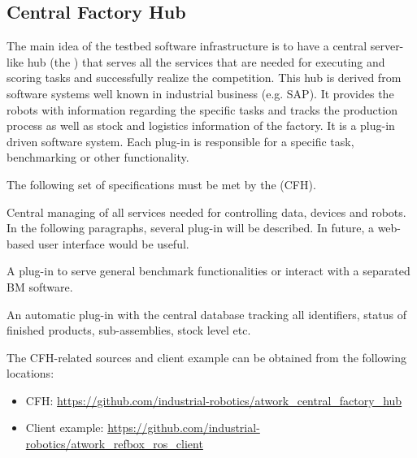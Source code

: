 
\subsection{Central Factory Hub}
\label{ssec:CFH}

The main idea of the \erlir testbed software infrastructure is to have a central server-like hub (the \erlir \CFH) that serves all the services that are needed for executing and scoring tasks and successfully realize the competition. This hub is derived from software systems well known in industrial business (e.g. SAP). It provides the robots with information regarding the specific tasks and tracks the production process as well as stock and logistics information of the \rollin factory. It is a plug-in driven software system. Each plug-in is responsible for a specific task, benchmarking or other functionality.

\noindent
The following set of specifications must be met by the \erlir \CFH (CFH).
\begin{CFHSpec}
Central managing of all services needed for controlling data, devices and robots. In the following paragraphs, several plug-in will be described. In future, a web-based user interface would be useful.
\end{CFHSpec}

\begin{CFHSpec}
A plug-in to serve general benchmark functionalities or interact with a separated BM software.
\end{CFHSpec}

\begin{CFHSpec}
An automatic plug-in with the central database tracking all identifiers, status of finished products, sub-assemblies, stock level etc. 
\end{CFHSpec}

The CFH-related sources and client example can be obtained from the following locations:

\begin{itemize}
	\item CFH: \url{https://github.com/industrial-robotics/atwork_central_factory_hub}
	\item Client example: \url{https://github.com/industrial-robotics/atwork_refbox_ros_client}
\end{itemize}

